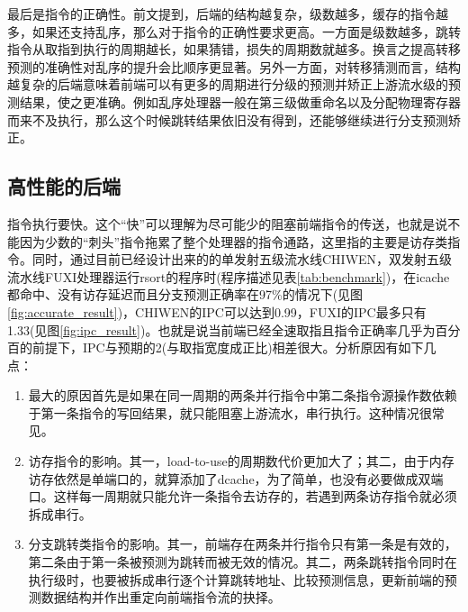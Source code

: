 	最后是指令的正确性。前文提到，后端的结构越复杂，级数越多，缓存的指令越多，如果还支持乱序，那么对于指令的正确性要求更高。一方面是级数越多，跳转指令从取指到执行的周期越长，如果猜错，损失的周期数就越多。换言之提高转移预测的准确性对乱序的提升会比顺序更显著。另外一方面，对转移猜测而言，结构越复杂的后端意味着前端可以有更多的周期进行分级的预测并矫正上游流水级的预测结果，使之更准确。例如乱序处理器一般在第三级做重命名以及分配物理寄存器而来不及执行，那么这个时候跳转结果依旧没有得到，还能够继续进行分支预测矫正。
	
	\subsection{高性能的后端}
	
	指令执行要快。这个``快''可以理解为尽可能少的阻塞前端指令的传送，也就是说不能因为少数的``刺头''指令拖累了整个处理器的指令通路，这里指的主要是访存类指令。同时，通过目前已经设计出来的的单发射五级流水线CHIWEN，双发射五级流水线FUXI处理器运行rsort的程序时(程序描述见表\ref{tab:benchmark})，在icache都命中、没有访存延迟而且分支预测正确率在97\%的情况下(见图\ref{fig:accurate_result})，CHIWEN的IPC可以达到0.99，FUXI的IPC最多只有1.33(见图\ref{fig:ipc_result})。也就是说当前端已经全速取指且指令正确率几乎为百分百的前提下，IPC与预期的2(与取指宽度成正比)相差很大。分析原因有如下几点：
	\begin{enumerate}[label=(\alph*)]
		\item 最大的原因首先是如果在同一周期的两条并行指令中第二条指令源操作数依赖于第一条指令的写回结果，就只能阻塞上游流水，串行执行。这种情况很常见。
		\item 访存指令的影响。其一，load-to-use的周期数代价更加大了；其二，由于内存访存依然是单端口的，就算添加了dcache，为了简单，也没有必要做成双端口。这样每一周期就只能允许一条指令去访存的，若遇到两条访存指令就必须拆成串行。
		\item 分支跳转类指令的影响。其一，前端存在两条并行指令只有第一条是有效的，第二条由于第一条被预测为跳转而被无效的情况。其二，两条跳转指令同时在执行级时，也要被拆成串行逐个计算跳转地址、比较预测信息，更新前端的预测数据结构并作出重定向前端指令流的抉择。
	\end{enumerate}

